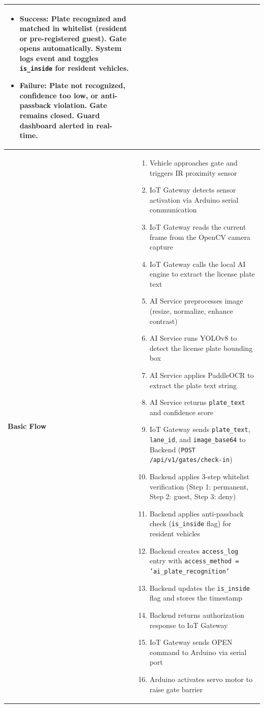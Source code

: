 \documentclass[a4paper]{article}
\newlength{\ucLeft}
\begin{document}
\begin{longtable}{|>{\bfseries}p{\ucLeft}|
                p{\dimexpr\textwidth-\ucLeft-4\tabcolsep-3\arrayrulewidth\relax}|}
\begin{itemize}[leftmargin=*, nosep, topsep=0pt, partopsep=0pt, parsep=0pt, after=\strut]
    \item \textbf{Success:} Plate recognized and matched in whitelist (resident or pre-registered guest). Gate opens automatically. System logs event and toggles \texttt{is\_inside} for resident vehicles.
    \item \textbf{Failure:} Plate not recognized, confidence too low, or anti-passback violation. Gate remains closed. Guard dashboard alerted in real-time.
\end{itemize}
\\ \hline
Basic Flow & 
\begin{enumerate}[leftmargin=*, nosep, topsep=0pt, partopsep=0pt, parsep=0pt]
    \item Vehicle approaches gate and triggers IR proximity sensor
    \item IoT Gateway detects sensor activation via Arduino serial communication
    \item IoT Gateway reads the current frame from the OpenCV camera capture
    \item IoT Gateway calls the local AI engine to extract the license plate text
    \item AI Service preprocesses image (resize, normalize, enhance contrast)
    \item AI Service runs YOLOv8 to detect the license plate bounding box
    \item AI Service applies PaddleOCR to extract the plate text string
    \item AI Service returns \texttt{plate\_text} and confidence score
    \item IoT Gateway sends \texttt{plate\_text}, \texttt{lane\_id}, and \texttt{image\_base64} to Backend (\texttt{POST /api/v1/gates/check-in})
    \item Backend applies 3-step whitelist verification (Step 1: permanent, Step 2: guest, Step 3: deny)
    \item Backend applies anti-passback check (\texttt{is\_inside} flag) for resident vehicles
    \item Backend creates \texttt{access\_log} entry with \texttt{access\_method = 'ai\_plate\_recognition'}
    \item Backend updates the \texttt{is\_inside} flag and stores the timestamp
    \item Backend returns authorization response to IoT Gateway
    \item IoT Gateway sends OPEN command to Arduino via serial port
    \item Arduino activates servo motor to raise gate barrier

\end{enumerate}
\end{longtable}
\end{document}
